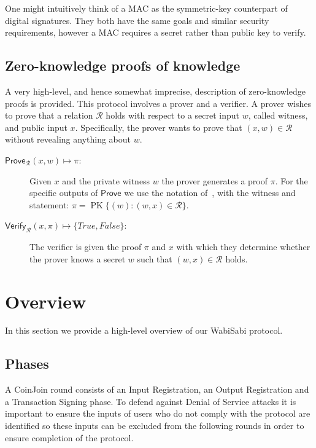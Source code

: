 \documentclass[a4paper]{article}
\begin{document}
One might intuitively think of a MAC as the symmetric-key counterpart of digital signatures. They both have the same goals and similar security requirements, however a MAC requires a secret rather than public key to verify.

\subsection{Zero-knowledge proofs of knowledge}
A very high-level, and hence somewhat imprecise, description of zero-knowledge proofs is provided. This protocol involves a prover and a verifier. A prover wishes to prove that a relation $\mathcal{R}$ holds with respect to a secret input $w$, called witness, and public input $x$. Specifically, the prover wants to prove that $(x, w) \in \mathcal{R}$ without revealing anything about $w$.

\begin{description}
\item[$\mathsf{Prove}_{\mathcal{R}}(x,w)\mapsto{}\pi$:] Given $x$ and the private witness $w$ the prover generates a proof $\pi$. For the specific outputs of $\mathsf{Prove}$ we use the notation of~\cite{camenisch1997proof}, with the witness and statement: $\pi = \operatorname{PK}\{ (w) : (w, x) \in \mathcal{R} \}$.

\item[$\mathsf{Verify}_{\mathcal{R}}(x,\pi)\mapsto{}\{\mathit{True},\mathit{False}\}$:] The verifier is given the proof $\pi$ and $x$ with which they determine whether the prover knows a secret $w$ such that $(w,x) \in \mathcal{R}$ holds.
\end{description}

\section{Overview} \label{sec:overview}
In this section we provide a high-level overview of our WabiSabi protocol.
\subsection{Phases}

A CoinJoin round consists of an Input Registration, an Output Registration and a Transaction Signing phase. To defend against Denial of Service attacks it is important to ensure the inputs of users who do not comply with the protocol are identified so these inputs can be excluded from the following rounds in order to ensure completion of the protocol.
\end{document}

